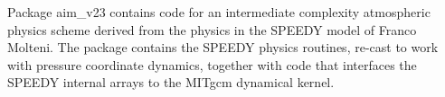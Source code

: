 
Package aim\_v23 contains code for an intermediate complexity atmospheric 
physics scheme derived from the physics in the SPEEDY model of Franco Molteni. 
The package contains the SPEEDY physics routines, re-cast to work with pressure
coordinate dynamics, together with code that interfaces the SPEEDY
internal arrays to the MITgcm dynamical kernel.
